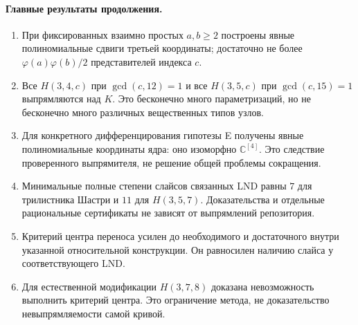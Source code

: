 \documentclass[11pt,a4paper]{article}
\begin{document}
\paragraph{Главные результаты продолжения.}
\begin{enumerate}
\item При фиксированных взаимно простых $a,b\geq2$ построены явные
полиномиальные сдвиги третьей координаты; достаточно не более
$\varphi(a)\varphi(b)/2$ представителей индекса $c$.
\item Все $H(3,4,c)$ при $\gcd(c,12)=1$ и все $H(3,5,c)$ при
$\gcd(c,15)=1$ выпрямляются над $K$. Это бесконечно много
параметризаций, но не бесконечно много различных вещественных типов узлов.
\item Для конкретного дифференцирования гипотезы E получены явные
полиномиальные координаты ядра: оно изоморфно $\mathbb C^{[4]}$.
Это следствие проверенного выпрямителя, не решение общей проблемы сокращения.
\item Минимальные полные степени слайсов связанных LND равны $7$ для
трилистника Шастри и $11$ для $H(3,5,7)$. Доказательства и отдельные
рациональные сертификаты не зависят от выпрямлений репозитория.
\item Критерий центра переноса усилен до необходимого и достаточного
внутри указанной относительной конструкции. Он равносилен наличию
слайса у соответствующего LND.
\item Для естественной модификации $H(3,7,8)$ доказана невозможность
выполнить критерий центра. Это ограничение метода, не доказательство
невыпрямляемости самой кривой.
\end{enumerate}









\end{document}
